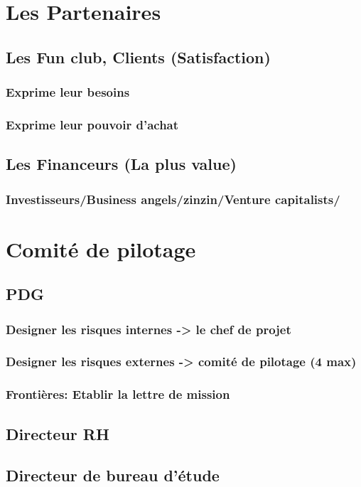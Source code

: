 \section{Les Partenaires}
	\subsection{Les Fun club, Clients (Satisfaction)}
		\subsubsection{Exprime leur besoins}
		\subsubsection{Exprime leur pouvoir d'achat}
	\subsection{Les Financeurs (La plus value)}
		\subsubsection{Investisseurs/Business angels/zinzin/Venture capitalists/}


\section{Comité de pilotage}
	\subsection{PDG}
		\subsubsection{Designer les risques internes -> le chef de projet}
		\subsubsection{Designer les risques externes -> comité de pilotage (4 max)}
		\subsubsection{Frontières: Etablir la lettre de mission}


	\subsection{Directeur RH}
	\subsection{Directeur de bureau d'étude}
